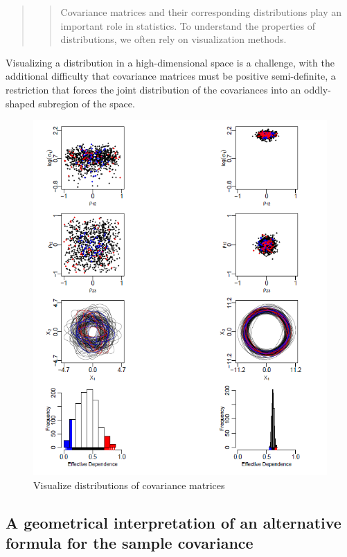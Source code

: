 \documentclass[
]{report}
\begin{document}
\begin{quote}
\begin{quote}
Covariance matrices and their corresponding distributions play an important role in statistics. To understand the properties of distributions, we often rely on visualization methods. \citep{VisCov}
\end{quote}
\end{quote}

Visualizing a distribution in a high-dimensional space is a challenge, with the additional difficulty that covariance matrices must be positive semi-definite, a restriction that forces the joint distribution of the covariances into an oddly-shaped subregion of the space.

\begin{figure}
    \centering
    \includegraphics{wtf_covViz.PNG}
    \caption{Visualize distributions of covariance matrices}
    \label{fig:my_label}
\end{figure}

\hypertarget{a-geometrical-interpretation-of-an-alternative-formula-for-the-sample-covariance}{%
\subsection{A geometrical interpretation of an alternative formula for the sample covariance}\label{a-geometrical-interpretation-of-an-alternative-formula-for-the-sample-covariance}}
\end{document}

